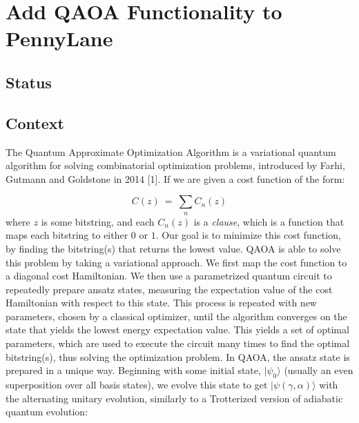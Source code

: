 \documentclass{article}
\begin{document}
\section{Add QAOA Functionality to PennyLane}

\subsection{Status}

\subsection{Context}

The Quantum Approximate Optimization Algorithm is a variational quantum algorithm for solving combinatorial 
optimization problems, introduced by Farhi, Gutmann and Goldstone in 2014 [1].
\newline\newline
\noindent
If we are given a cost function of the form:

\begin{equation}
	C(z) \ = \ \displaystyle\sum_{n} C_n(z)
\end{equation}
\noindent
where $z$ is some bitstring, and each $C_n(z)$ is a \textit{clause}, which is a function that maps 
each bitstring to either $0$ or $1$. Our goal is to minimize this cost function, by finding the 
bitstring(s) that returns the lowest value.
\newline\newline
\noindent
QAOA is able to solve this problem by taking a variational approach. We first map the cost function 
to a diagonal cost Hamiltonian. We then use a parametrized quantum circuit to repeatedly prepare ansatz states, 
measuring the expectation value of the cost Hamiltonian with respect to this state. This process is repeated with 
new parameters, chosen by a classical optimizer, until the algorithm converges on the state that yields the lowest 
energy expectation value. This yields a set of optimal parameters, which are used to execute the circuit many times to 
find the optimal bitstring(s), thus solving the optimization problem.
\newline\newline
\noindent
In QAOA, the ansatz state is prepared in a unique way. Beginning with some initial state, $|\psi_0\rangle$ (usually an 
even superposition over all basis states), we evolve this state to get $|\psi(\gamma, \alpha)\rangle$ with the 
alternating unitary evolution, similarly to a Trotterized version of adiabatic quantum evolution:
\end{document}
